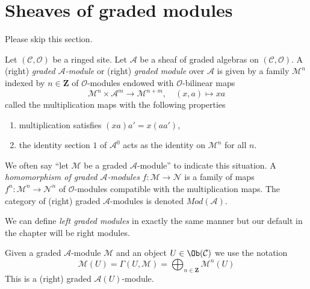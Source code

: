 \section{Sheaves of graded modules}
\label{section-graded-modules}

\noindent
Please skip this section.

\begin{definition}
\label{definition-gm}
Let $(\mathcal{C}, \mathcal{O})$ be a ringed site.
Let $\mathcal{A}$ be a sheaf of graded algebras
on $(\mathcal{C}, \mathcal{O})$.
A (right) {\it graded $\mathcal{A}$-module} or (right)
{\it graded module} over $\mathcal{A}$
is given by a family $\mathcal{M}^n$ indexed by $n \in \mathbf{Z}$
of $\mathcal{O}$-modules endowed with
$\mathcal{O}$-bilinear maps
$$
\mathcal{M}^n \times \mathcal{A}^m \to \mathcal{M}^{n + m},\quad
(x, a) \longmapsto xa
$$
called the multiplication maps with the following properties
\begin{enumerate}
\item multiplication satisfies $(xa)a' = x(aa')$,
\item the identity section $1$ of $\mathcal{A}^0$
acts as the identity on $\mathcal{M}^n$ for all $n$.
\end{enumerate}
We often say ``let $\mathcal{M}$ be a graded $\mathcal{A}$-module''
to indicate this situation.
A {\it homomorphism of graded $\mathcal{A}$-modules}
$f : \mathcal{M} \to \mathcal{N}$ is a family of maps
$f^n : \mathcal{M}^n \to \mathcal{N}^n$
of $\mathcal{O}$-modules compatible with the multiplication maps.
The category of (right) graded $\mathcal{A}$-modules
is denoted $\textit{Mod}(\mathcal{A})$.
\end{definition}

\noindent
We can define {\it left graded modules} in exactly the same manner
but our default in the chapter will be right modules.

\medskip\noindent
Given a graded $\mathcal{A}$-module $\mathcal{M}$
and an object $U \in \Ob(\mathcal{C})$ we use the notation
$$
\mathcal{M}(U) =
\Gamma(U, \mathcal{M}) =
\bigoplus\nolimits_{n \in \mathbf{Z}} \mathcal{M}^n(U)
$$
This is a (right) graded $\mathcal{A}(U)$-module.

